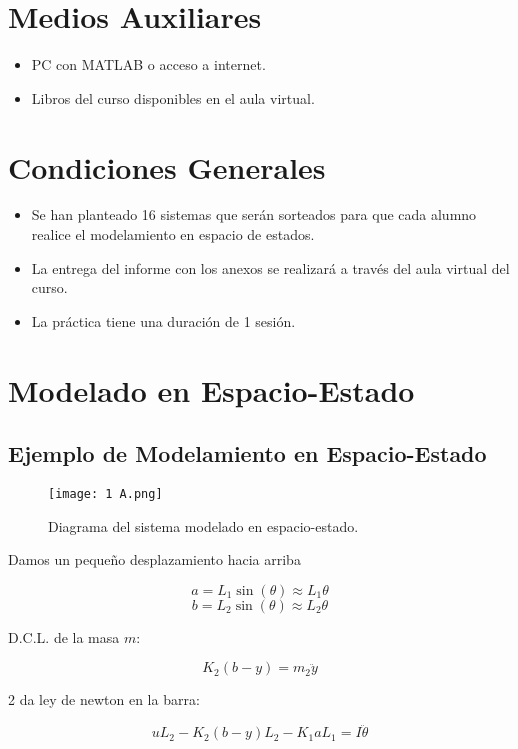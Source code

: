 \documentclass{report}
\begin{document}
\section{Medios Auxiliares}
\begin{itemize}
    \item PC con MATLAB o acceso a internet.
    \item Libros del curso disponibles en el aula virtual.
\end{itemize}

\section{Condiciones Generales}
\begin{itemize}
    \item Se han planteado 16 sistemas que serán sorteados para que cada alumno realice el modelamiento en espacio de estados.
    \item La entrega del informe con los anexos se realizará a través del aula virtual del curso.
    \item La práctica tiene una duración de 1 sesión.
\end{itemize}

\section{Modelado en Espacio-Estado}
    \subsection{Ejemplo de Modelamiento en Espacio-Estado}

\begin{figure}[H]
    \centering
    \texttt{[image: 1 A.png]}
    \caption{Diagrama del sistema modelado en espacio-estado.}
    \label{fig:diagrama_modelo}
\end{figure}

Damos un pequeño desplazamiento hacia arriba

\[
a = L_1 \sin(\theta) \approx L_1 \theta
\]
\[
b = L_2 \sin(\theta) \approx L_2 \theta
\]

D.C.L. de la masa \(m\):

\[
K_2(b - y) = m_2 \ddot{y}
\]

2 da ley de newton en la barra:

\[
uL_2 - K_2(b - y)L_2 - K_1 aL_1 = I\ddot{\theta}
\]
\end{document}
